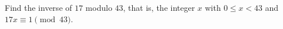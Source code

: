 Find the inverse of $17$ modulo $43$, that is, the integer $x$ with $0\le x<43$ and $17x\equiv1\pmod{43}$.

